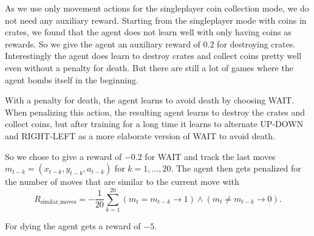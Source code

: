 
As we use only movement actions for the singleplayer coin collection mode, we do not need any auxiliary reward. Starting from the singleplayer mode with coins in crates, we found that the agent does not learn well with only having coins as rewards. So we give the agent an auxiliary reward of $0.2$ for destroying crates.
Interestingly the agent does learn to destroy crates and collect coins pretty well even without a penalty for death. But there are still a lot of games where the agent bombs itself in the beginning.

With a penalty for death, the agent learns to avoid death by choosing WAIT. When penalizing this action, the resulting agent learns to destroy the crates and collect coins, but after training for a long time it learns to alternate UP-DOWN and RIGHT-LEFT as a more elaborate version of WAIT to avoid death.

So we chose to give a reward of $-0.2$ for WAIT and track the last moves $m_{t-k} = (x_{t-k}, y_{t-k}, a_{t-k})$ for $k=1,\dots,20$. The agent then gets penalized for the number of moves that are similar to the current move with
$$
R_{\text{similar\_moves}} = - \frac{1}{20} \sum_{k=1}^{20} (m_t = m_{t-k} \rightarrow 1) \land(m_t \neq m_{t-k} \rightarrow 0).
$$

For dying the agent gets a reward of $-5$.
